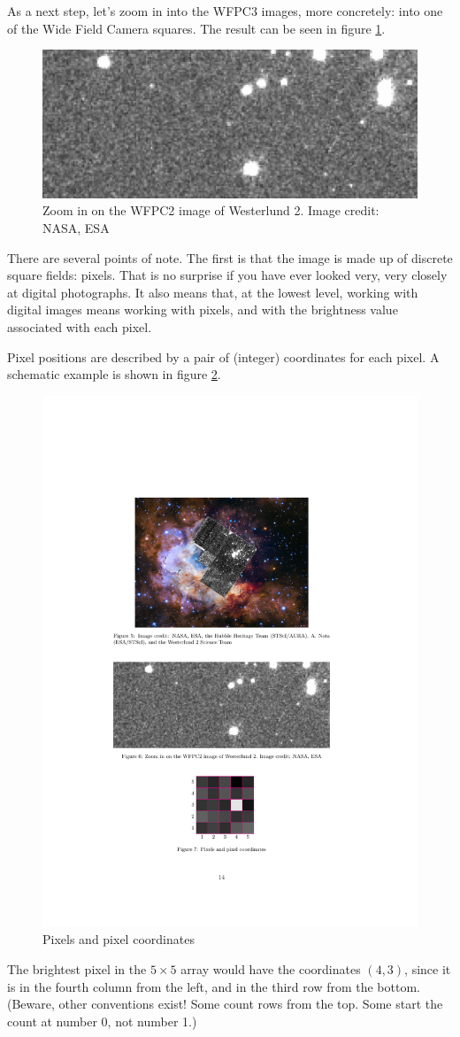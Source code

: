 \documentclass[twocolumn,apj]{openjournal}
\begin{document}
As a next step, let's zoom in into the WFPC3 images, more concretely: into one of the Wide Field Camera squares. The result can be seen in figure \ref{Westerlund2Zoom}.
\begin{figure}[htbp]
\begin{center}
\includegraphics[width=\linewidth]{westerlund2pixel.jpg}
\caption{Zoom in on the WFPC2 image of Westerlund 2. Image credit: NASA, ESA}
\label{Westerlund2Zoom}
\end{center}
\end{figure}
There are several points of note. The first is that the image is made up of discrete square fields: pixels. That is no surprise if you have ever looked very, very closely at digital photographs. It also means that, at the lowest level, working with digital images means working with pixels, and with the brightness value associated with each pixel.

Pixel positions are described by a pair of (integer) coordinates for each pixel. A schematic example is shown in figure \ref{PixelExample}.

\begin{figure}[htbp]
\begin{center}
\includegraphics[width=0.35\linewidth]{pixel-scheme.pdf}
\caption{Pixels and pixel coordinates}
\label{PixelExample}
\end{center}
\end{figure}
The brightest pixel in the $5\times 5$ array would have the coordinates $(4,3)$, since it is in the fourth column from the left, and in the third row from the bottom. (Beware, other conventions exist! Some count rows from the top. Some start the count at number 0, not number 1.)
\end{document}

